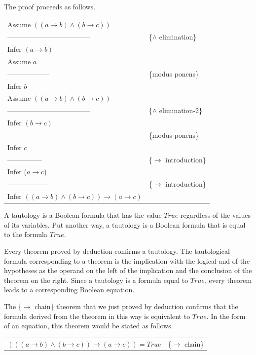 The proof proceeds as follows.
\begin{center}
\begin{tabular}{ll}
Assume $((a \rightarrow b) \wedge (b \rightarrow c))$ & \\
------------------------------------                  &\{$\wedge$ elimination\} \\
Infer $(a \rightarrow b)$                             & \\
Assume $a$                                            & \\
------------------                                    &\{modus ponens\} \\
Infer $b$                                             & \\
Assume $((a \rightarrow b) \wedge (b \rightarrow c))$ & \\
------------------------------------                  &\{$\wedge$ elimination-2\} \\
Infer $(b \rightarrow c)$                             & \\
------------------                                    &\{modus ponens\} \\
Infer $c$                                             & \\
---------------                                       &\{$\rightarrow$ introduction\} \\
Infer ($a \rightarrow c$)                             & \\
------------------                                    &\{$\rightarrow$ introduction\} \\
Infer $((a \rightarrow b) \wedge (b \rightarrow c)) \rightarrow (a \rightarrow c)$ & \\
\end{tabular}
\end{center}

A tautology is a Boolean formula that has the value $True$ regardless of the values of its variables.
Put another way, a tautology is a Boolean formula that is equal to the formula $True$.

Every theorem proved by deduction confirms a tautology.
The tautological formula corresponding to a theorem is the implication with the logical-and
of the hypotheses as the operand on the left of the implication and the conclusion of the theorem
on the right. Since a tautology is a formula equal to $True$, every theorem leads to
a corresponding Boolean equation.

The \{$\rightarrow$ chain\} theorem that we just proved by deduction
confirms that the formula derived from the theorem in this way is equivalent to $True$.
In the form of an equation, this theorem would be stated as follows.
\begin{center}
\begin{tabular}{ll}
$(((a \rightarrow b) \wedge (b \rightarrow c)) \rightarrow (a \rightarrow c)) = True$ &\{$\rightarrow$ chain\}
\end{tabular}
\end{center}

